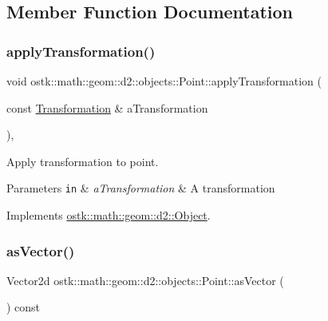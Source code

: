 \subsection{Member Function Documentation}
\mbox{\label{classostk_1_1math_1_1geom_1_1d2_1_1objects_1_1_point_aa880df23e5ee93a60dad85597c600fb0}} 
\subsubsection{\texorpdfstring{apply\+Transformation()}{applyTransformation()}}
{\footnotesize\ttfamily void ostk\+::math\+::geom\+::d2\+::objects\+::\+Point\+::apply\+Transformation (\begin{DoxyParamCaption}\item[{const \hyperlink{classostk_1_1math_1_1geom_1_1d2_1_1_transformation}{Transformation} \&}]{a\+Transformation }\end{DoxyParamCaption})\hspace{0.3cm}{\ttfamily [override]}, {\ttfamily [virtual]}}



Apply transformation to point. 


\begin{DoxyParams}[1]{Parameters}
\mbox{\tt in}  & {\em a\+Transformation} & A transformation \\
\hline
\end{DoxyParams}


Implements \hyperlink{classostk_1_1math_1_1geom_1_1d2_1_1_object_a959e50211d7a680f7f904bbb752d75c9}{ostk\+::math\+::geom\+::d2\+::\+Object}.

\mbox{\label{classostk_1_1math_1_1geom_1_1d2_1_1objects_1_1_point_a19aa06ed436313a39c332caffcf2c86a}} 
\subsubsection{\texorpdfstring{as\+Vector()}{asVector()}}
{\footnotesize\ttfamily Vector2d ostk\+::math\+::geom\+::d2\+::objects\+::\+Point\+::as\+Vector (\begin{DoxyParamCaption}{ }\end{DoxyParamCaption}) const}




